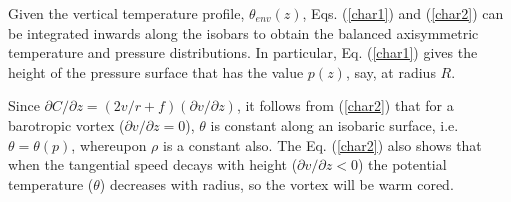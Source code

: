 Given the vertical temperature profile, $\theta_{env}(z)$, Eqs. (\ref{char1}) and (\ref{char2}) can be integrated inwards along the isobars to obtain the balanced axisymmetric temperature and pressure distributions. In particular, Eq. (\ref{char1}) gives the height of the pressure surface that has the value $p(z)$, say, at radius $R$. 

Since $\partial{C}/\partial{z}=(2v/r+f)(\partial{v}/\partial{z})$, it follows from (\ref{char2}) that for a barotropic vortex ($\partial{v}/\partial{z}=0$), $\theta$ is constant along an isobaric surface, i.e. $\theta=\theta(p)$, whereupon $\rho$ is a constant also. The Eq. (\ref{char2}) also shows that when the tangential speed decays with height ($\partial{v}/\partial{z}<0$) the potential temperature ($\theta$) decreases with radius, so the vortex will be warm cored.